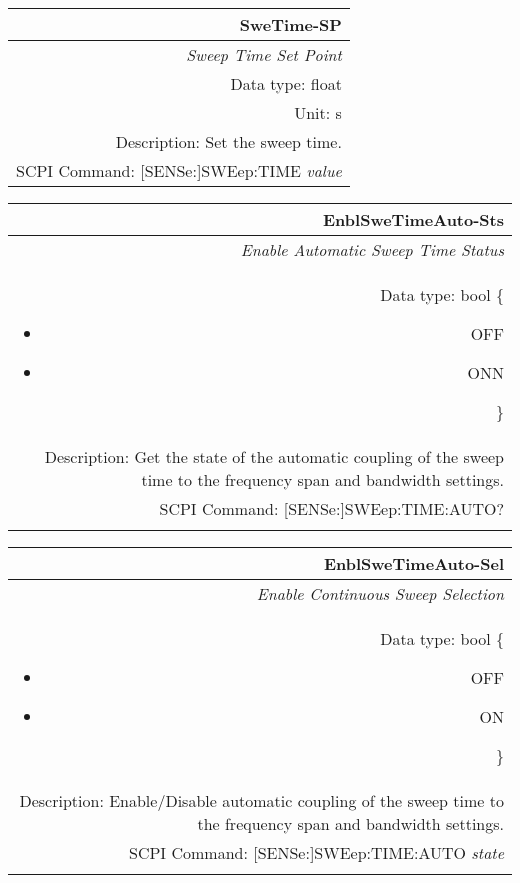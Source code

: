 \documentclass[openany]{article}
\begin{document}
		\begin{tabular}{N}
			\hline
			\bfseries SweTime-SP \\ \hline
			\emph{Sweep Time Set Point} \\
			Data type: float \\
			Unit: s \\
			Description: Set the sweep time. \\
			SCPI Command: [SENSe:]SWEep:TIME \emph{value} \\

		\end{tabular}

		\begin{tabular}{N}
			\hline
			\bfseries EnblSweTimeAuto-Sts \\ \hline
			\emph{Enable Automatic Sweep Time Status} \\
			Data type: bool \{\begin{itemize}[noitemsep]
				\small
				\item[] OFF
				\item[] ONN
			\end{itemize}\} \\
			Description: Get the state of the automatic coupling of the sweep time to the frequency span and bandwidth settings. \\
			SCPI Command: [SENSe:]SWEep:TIME:AUTO? \\
			\\

		\end{tabular}

		\begin{tabular}{N}
			\hline
			\bfseries EnblSweTimeAuto-Sel \\ \hline
			\emph{Enable Continuous Sweep Selection} \\
			Data type: bool \{\begin{itemize}[noitemsep]
				\small
				\item[] OFF
				\item[] ON
			\end{itemize}\} \\
			Description: Enable/Disable automatic coupling of the sweep time to the frequency span and bandwidth settings. \\
			SCPI Command: [SENSe:]SWEep:TIME:AUTO \emph{state} \\
			\\

		\end{tabular}
\end{document}
